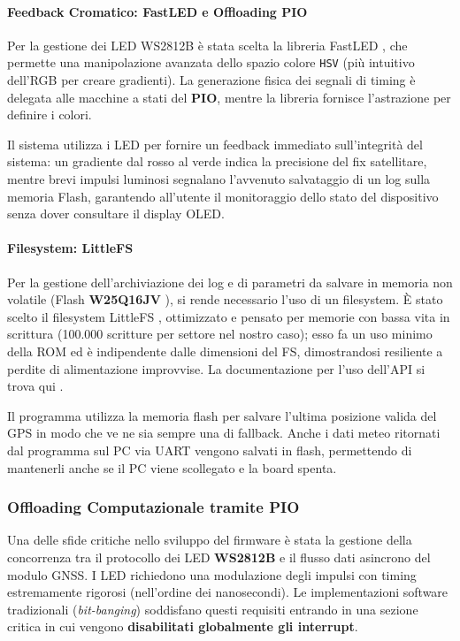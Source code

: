 \paragraph{Feedback Cromatico: FastLED e Offloading PIO}

Per la gestione dei LED WS2812B è stata scelta la libreria FastLED \cite{fastled_lib}, che permette una manipolazione avanzata dello spazio colore \texttt{HSV} (più intuitivo dell'RGB per creare gradienti). La generazione fisica dei segnali di timing è delegata alle macchine a stati del \textbf{PIO}, mentre la libreria fornisce l'astrazione per definire i colori.

Il sistema utilizza i LED per fornire un feedback immediato sull'integrità del sistema: un gradiente dal rosso al verde indica la precisione del fix satellitare, mentre brevi impulsi luminosi segnalano l'avvenuto salvataggio di un log sulla memoria Flash, garantendo all'utente il monitoraggio dello stato del dispositivo senza dover consultare il display OLED.

\paragraph{Filesystem: LittleFS}

Per la gestione dell'archiviazione dei log e di parametri da salvare in memoria non volatile (Flash \textbf{W25Q16JV} \cite{w25q16_ds}), si rende necessario l'uso di un filesystem. \`E stato scelto il filesystem LittleFS \cite{littlefs_repo}, ottimizzato e pensato per memorie con bassa vita in scrittura (100.000 scritture per settore nel nostro caso); esso fa un uso minimo della ROM ed è indipendente dalle dimensioni del FS, dimostrandosi resiliente a perdite di alimentazione improvvise. La documentazione per l'uso dell'API si trova qui \cite{pico_arduino_core}. 

Il programma utilizza la memoria flash per salvare l'ultima posizione valida del GPS in modo che ve ne sia sempre una di fallback.
Anche i dati meteo ritornati dal programma sul PC via UART vengono salvati in flash, permettendo di mantenerli anche se il PC viene scollegato e la board spenta.



\subsubsection*{Offloading Computazionale tramite PIO}

Una delle sfide critiche nello sviluppo del firmware è stata la gestione della concorrenza tra il protocollo dei LED \textbf{WS2812B} e il flusso dati asincrono del modulo GNSS. I LED richiedono una modulazione degli impulsi con timing estremamente rigorosi (nell'ordine dei nanosecondi). Le implementazioni software tradizionali (\textit{bit-banging}) soddisfano questi requisiti entrando in una sezione critica in cui vengono \textbf{disabilitati globalmente gli interrupt}. 

